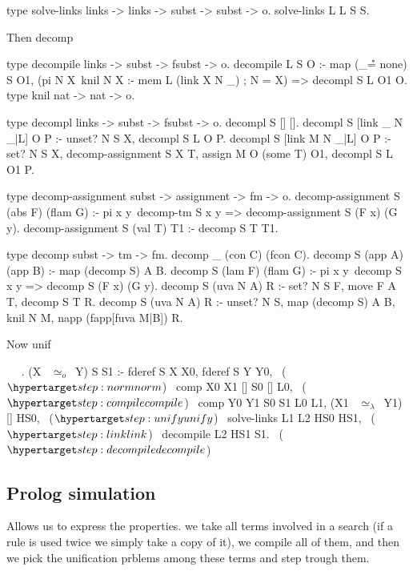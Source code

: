 \documentclass[sigconf,natbib=false,review]{acmart}
\newcommand{\UnifRel}{\ensuremath{\simeq}}
\newcommand{\Uo}{\ensuremath{\UnifRel_o}\xspace}
\newcommand{\Ue}{\ensuremath{\UnifRel_\lambda}\xspace}
\begin{document}
\begin{elpicode}
type solve-links links -> links -> subst -> subst -> o.
solve-links L L S S.
\end{elpicode}

Then decomp

\begin{elpicode}
type decompile links -> subst -> fsubst -> o.
decompile L S O :-
  map (_\r\r = none) S O1, %
  (pi N X\ knil N X :- mem L (link X N _) ; N = X) =>
    decompl S L O1 O.
type knil nat -> nat -> o.

type decompl links -> subst -> fsubst -> o.
decompl S [] [].
decompl S [link _ N _|L] O P :- unset? N S X,
  decompl S L O P.
decompl S [link M N _|L] O P :- set? N S X,
  decomp-assignment S X T, assign M O (some T) O1,
  decompl S L O1 P.

type decomp-assignment subst -> assignment -> fm -> o.
decomp-assignment S (abs F) (flam G) :-
  pi x y\ decomp-tm S x y => decomp-assignment S (F x) (G y).
decomp-assignment S (val T) T1 :- decomp S T T1.

type decomp subst -> tm -> fm.
decomp _ (con C) (fcon C).
decomp S (app A) (app B) :- map (decomp S) A B.
decomp S (lam F) (flam G) :-
  pi x y\ decomp S x y => decomp S (F x) (G y).
decomp S (uva N A) R :- set? N S F,
  move F A T, decomp S T R.
decomp S (uva N A) R :- unset? N S,
  map (decomp S) A B, knil N M, napp (fapp[fuva M|B]) R.
\end{elpicode}
  

Now unif

\begin{elpicode}
~ \PYG{n+nf}{(\Uo)} ~.
(X ~\Uo~Y) S S1 :-
  fderef S X X0, fderef S Y Y0,                    ~($\customlabel{step:norm}{norm}$)~
  comp X0 X1 [] S0 [] L0,                        ~($\customlabel{step:compile}{compile}$)~
  comp Y0 Y1 S0 S1 L0 L1,
  (X1 ~\Ue~Y1) [] HS0,                              ~($\customlabel{step:unify}{unify}$)~
  solve-links L1 L2 HS0 HS1,                        ~($\customlabel{step:link}{link}$)~
  decompile L2 HS1  S1.                        ~($\customlabel{step:decompile}{decompile}$)~
\end{elpicode}

\subsection{Prolog simulation}
Allows us to express the properties.
we take all terms involved in a search (if a rule is used twice we simply
take a copy of it), we compile all of them, and then we pick the unification
prblems among these terms and step trough them.
\end{document}

